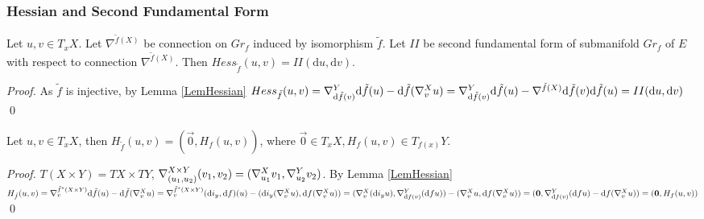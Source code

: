 \documentclass{llncs}
\newcommand{\CovariantDiffManif}[1]{\nabla^{#1}}
\newcommand{\CovariantDerivManif}[2]{\tensor*{\nabla}{^{#1}_{#2}}}
\newcommand{\Diff}{\mathrm{d}}
\newcommand {\Preimage}[2]{{#2}^*{#1}}
\begin{document}
\subsubsection{Hessian and Second Fundamental Form}

\begin{lemma}  \label{LemSecondFormHessian}
Let $u, v \in T_xX$. Let $\CovariantDiffManif{\tilde{f}(X)}$ be connection on $Gr_f$ induced by isomorphism $\tilde{f}$. Let $II$ be second fundamental form of submanifold $Gr_f$ of $E$ with respect to connection $\CovariantDiffManif{\tilde{f}(X)}$. Then $Hess_{\tilde{f}}(u, v) = II(\Diff u, \Diff v)$.
\end{lemma}

\begin{proof}
As $\tilde{f}$ is injective, by Lemma \ref{LemHessian} $Hess_{\tilde{f}}(u, v) = 
						\CovariantDerivManif{Y} {\Diff \tilde{f}(v)} \Diff \tilde{f}(u) - 
							\Diff \tilde{f}(\CovariantDerivManif{X}{v}u ) = \CovariantDerivManif{Y} {\Diff \tilde{f}(v)} \Diff \tilde{f}(u) - 
							\CovariantDiffManif{\tilde{f}(X)}{\Diff \tilde{f}(v)}\Diff \tilde{f}(u) = II(\Diff u, \Diff v)$
\qed
\end{proof}

\begin{lemma} \label{LemBigSmallHess}
Let $u, v \in T_xX$, 
then $H_{\tilde{f}}(u, v) = (\vec{0}, H_f(u, v))$,
where $\vec{0} \in T_xX, H_f(u, v) \in T_{f(x)}Y$.
\end{lemma}

\begin{proof}
$T(X\times Y)=TX\times TY$, $\CovariantDerivManif{X\times Y}{(u_1, u_2)}{(v_1, v_2)} = (\CovariantDerivManif{X}{u_1}{v_1}, \CovariantDerivManif{Y}{u_2}{v_2})$. 
By Lemma \ref{LemHessian} 
$H_{\tilde{f}}(u, v)=
\CovariantDerivManif{\Preimage{(X \times Y)}{\tilde{f}}} {v} \Diff \tilde{f}(u) - 
							\Diff \tilde{f}( 
							\CovariantDerivManif{X}{v}u
							) =
							\CovariantDerivManif{\Preimage{(X \times Y)}{\tilde{f}}}{v} (\Diff i_y, \Diff f)(u) - 
							(\Diff i_y( 
							\CovariantDerivManif{X}{v}u
							), \Diff f( 
							\CovariantDerivManif{X}{v}u
							)) =
							(\CovariantDerivManif{X}{v} (\Diff i_y u), \CovariantDerivManif{Y}{\Diff f(v)} (\Diff f u)) - 
							(\CovariantDerivManif{X}{v}u, \Diff f( 
							\CovariantDerivManif{X}{v}u)
							) =
							(\vec{0}, \CovariantDerivManif{Y}{\Diff f(v)} (\Diff f u) - \Diff f( 
							\CovariantDerivManif{X}{v}u)) =
							(\vec{0}, H_f(u, v))$
\qed 
\end{proof}
\end{document}
